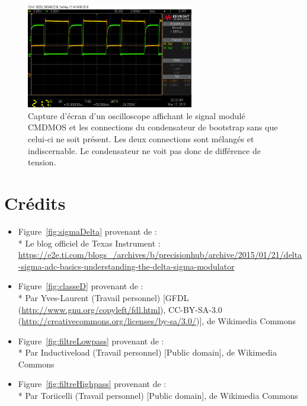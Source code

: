 \documentclass[10pt, oneside, a4paper]{article}
\begin{document}
\begin{figure}[p]
	\centering
	\includegraphics[width=0.65\textwidth]{image/12-05/scope_10.png}
	\caption{Capture d'écran d'un oscilloscope affichant le signal modulé CMDMOS et les
			 connections du condensateur de bootstrap sans que celui-ci ne soit présent.
			 Les deux connections sont mélangés et indiscernable.
			 Le condensateur ne voit pas donc de différence de tension.}
	\label{fig:scope-10}
\end{figure}


\pagebreak
\section*{Crédits}
    
\begin{itemize}
\item Figure~\ref{fig:sigmaDelta} provenant de :\\*
Le blog officiel de Texas Instrument :
\url{https://e2e.ti.com/blogs_/archives/b/precisionhub/archive/2015/01/21/delta-sigma-adc-basics-understanding-the-delta-sigma-modulator}

\item Figure~\ref{fig:classeD} provenant de :\\*
Par Yves-Laurent (Travail personnel) [GFDL (\url{http://www.gnu.org/copyleft/fdl.html}),
CC-BY-SA-3.0 (\url{http://creativecommons.org/licenses/by-sa/3.0/})], de Wikimedia Commons

\item Figure~\ref{fig:filtreLowpass} provenant de :\\*
Par Inductiveload (Travail personnel) [Public domain], de Wikimedia Commons

\item Figure~\ref{fig:filtreHighpass} provenant de :\\*
Par Toriicelli (Travail personnel) [Public domain], de Wikimedia Commons
\end{itemize}
\end{document}
